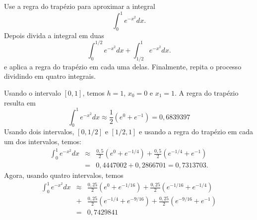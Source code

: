 \begin{ex}
Use a regra do trapézio para aproximar a integral
$$
\int_0^1e^{-x^2}dx.
$$
Depois divida a integral em duas
$$
\int_0^{1/2}e^{-x^2}dx+\int_{1/2}^{1}e^{-x^2}dx.
$$
e aplica a regra do trapézio em cada uma delas. Finalmente, repita o processo dividindo em quatro integrais.
\end{ex}
Usando o intervalo $[0,1]$, temos $h=1$, $x_0=0$ e $x_1=1$. A regra do trapézio resulta em
$$
\int_0^1e^{-x^2}dx\approx \frac{1}{2}(e^{0}+e^{-1})=0,6839397
$$
Usando dois intervalos, $[0,1/2]$ e $[1/2,1]$ e usando a regra do trapézio em cada um dos intervalos, temos:
\begin{eqnarray*}
\int_0^1e^{-x^2}dx &\approx& \frac{0,5}{2}\left(e^{0}+e^{-1/4}\right) + \frac{0,5}{2}\left(e^{-1/4}+e^{-1}\right) \\
&=& 0,4447002+0,2866701 =0,7313703.
\end{eqnarray*}
Agora, usando quatro intervalos, temos
\begin{eqnarray*}
\int_0^1e^{-x^2}dx &\approx& \frac{0,25}{2}\left(e^{0}+e^{-1/16}\right) + \frac{0,25}{2}\left(e^{-1/16}+e^{-1/4}\right) \\
&+& \frac{0,25}{2}\left(e^{-1/4}+e^{-9/16}\right)+\frac{0,25}{2}\left(e^{-9/16}+e^{-1}\right) \\
&=& 0,7429841
\end{eqnarray*}

